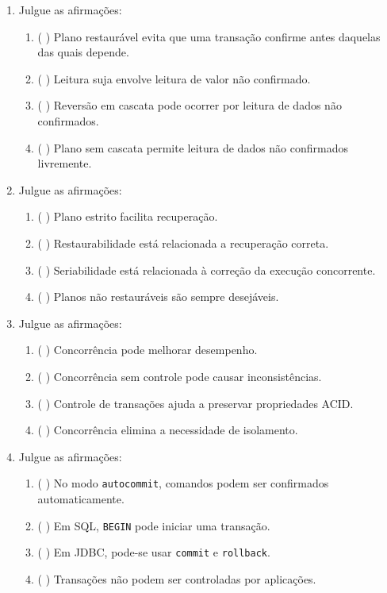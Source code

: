 \documentclass[12pt,a4paper]{article}
\begin{document}
\begin{enumerate}[resume,label=\textbf{Q\arabic*.}]
\item Julgue as afirmações:

\begin{enumerate}[label=\alph*)]
    \item ( \quad ) Plano restaurável evita que uma transação confirme antes daquelas das quais depende.
    \item ( \quad ) Leitura suja envolve leitura de valor não confirmado.
    \item ( \quad ) Reversão em cascata pode ocorrer por leitura de dados não confirmados.
    \item ( \quad ) Plano sem cascata permite leitura de dados não confirmados livremente.
\end{enumerate}

\item Julgue as afirmações:

\begin{enumerate}[label=\alph*)]
    \item ( \quad ) Plano estrito facilita recuperação.
    \item ( \quad ) Restaurabilidade está relacionada a recuperação correta.
    \item ( \quad ) Seriabilidade está relacionada à correção da execução concorrente.
    \item ( \quad ) Planos não restauráveis são sempre desejáveis.
\end{enumerate}

\item Julgue as afirmações:

\begin{enumerate}[label=\alph*)]
    \item ( \quad ) Concorrência pode melhorar desempenho.
    \item ( \quad ) Concorrência sem controle pode causar inconsistências.
    \item ( \quad ) Controle de transações ajuda a preservar propriedades ACID.
    \item ( \quad ) Concorrência elimina a necessidade de isolamento.
\end{enumerate}

\item Julgue as afirmações:

\begin{enumerate}[label=\alph*)]
    \item ( \quad ) No modo \texttt{autocommit}, comandos podem ser confirmados automaticamente.
    \item ( \quad ) Em SQL, \texttt{BEGIN} pode iniciar uma transação.
    \item ( \quad ) Em JDBC, pode-se usar \texttt{commit} e \texttt{rollback}.
    \item ( \quad ) Transações não podem ser controladas por aplicações.
\end{enumerate}

\end{enumerate}
\end{document}
